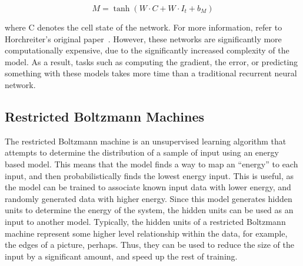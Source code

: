 \documentclass{article}
\begin{document}
$$M = \tanh(W\cdot C + W\cdot I_t + b_M)$$

where C denotes the cell state of the network. For more information, refer to
Horchreiter's original paper~\cite{lstm}. However, these networks are
significantly more computationally expensive, due to the significantly increased
complexity of the model. As a result, tasks such as computing the gradient, the
error, or predicting something with these models takes more time than a
traditional recurrent neural network.

\subsection{Restricted Boltzmann Machines}
The restricted Boltzmann machine is an unsupervised learning algorithm that
attempts to determine the distribution of a sample of input using an energy
based model. This means that the model finds a way to map an ``energy'' to each
input, and then probabilistically finds the lowest energy input. This is useful,
as the model can be trained to associate known input data with lower energy, and
randomly generated data with higher energy. Since this model generates hidden
units to determine the energy of the system, the hidden units can be used as an
input to another model. Typically, the hidden units of a restricted Boltzmann
machine represent some higher level relationship within the data, for example,
the edges of a picture, perhaps. Thus, they can be used to reduce the size of
the input by a significant amount, and speed up the rest of training.
\end{document}
